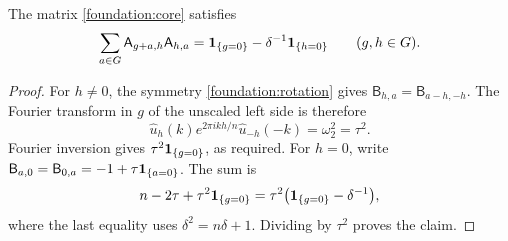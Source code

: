\begin{proposition}\label{foundation:quadratics}
The matrix \eqref{foundation:core} satisfies
\begin{equation}\label{foundation:Q}
 \sum_{a\in G}\mathsf A_{g+a,h}\mathsf A_{h,a}
 =\mathbf1_{\{g=0\}}-\delta^{-1}\mathbf1_{\{h=0\}}
 \qquad(g,h\in G).
\end{equation}
\end{proposition}

\begin{proof}
For $h\ne0$, the symmetry \eqref{foundation:rotation} gives
$\mathsf B_{h,a}=\mathsf B_{a-h,-h}$.
The Fourier transform in $g$ of the unscaled left side is therefore
\[
 \widehat u_h(k)e^{2\pi ikh/n}
 \widehat u_{-h}(-k)=\omega_2^2=\tau^2.
\]
Fourier inversion gives $\tau^2\mathbf1_{\{g=0\}}$, as required.
For $h=0$, write $\mathsf B_{a,0}=\mathsf B_{0,a}
=-1+\tau\mathbf1_{\{a=0\}}$. The sum is
\[
 n-2\tau+\tau^2\mathbf1_{\{g=0\}}
 =\tau^2\bigl(\mathbf1_{\{g=0\}}-\delta^{-1}\bigr),
\]
where the last equality uses $\delta^2=n\delta+1$.
Dividing by $\tau^2$ proves the claim.
\end{proof}
